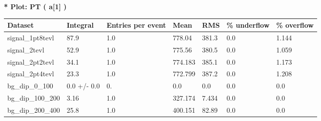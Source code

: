 \documentclass[a4paper, 10pt]{article}
\begin{document}
\textbf{* Plot: PT ( a[1] ) }\\
   \begin{table}[H]
  \begin{center}
    \begin{tabular}{|m{23.0mm}|m{23.0mm}|m{18.0mm}|m{19.0mm}|m{19.0mm}|m{19.0mm}|m{19.0mm}|}
      \hline
      {\cellcolor{yellow}         Dataset}& {\cellcolor{yellow}         Integral}& {\cellcolor{yellow}         Entries per event}& {\cellcolor{yellow}         Mean}& {\cellcolor{yellow}         RMS}& {\cellcolor{yellow}         \% underflow}& {\cellcolor{yellow}         \% overflow}\\
      \hline
      {\cellcolor{white}         signal\_1pt8tevl}& {\cellcolor{white}         87.9}& {\cellcolor{white}         1.0}& {\cellcolor{white}         778.04}& {\cellcolor{white}         381.3}& {\cellcolor{green}         0.0}& {\cellcolor{green}         1.144}\\
      \hline
      {\cellcolor{white}         signal\_2tevl}& {\cellcolor{white}         52.9}& {\cellcolor{white}         1.0}& {\cellcolor{white}         775.56}& {\cellcolor{white}         380.5}& {\cellcolor{green}         0.0}& {\cellcolor{green}         1.059}\\
      \hline
      {\cellcolor{white}         signal\_2pt2tevl}& {\cellcolor{white}         34.1}& {\cellcolor{white}         1.0}& {\cellcolor{white}         774.183}& {\cellcolor{white}         385.1}& {\cellcolor{green}         0.0}& {\cellcolor{green}         1.173}\\
      \hline
      {\cellcolor{white}         signal\_2pt4tevl}& {\cellcolor{white}         23.3}& {\cellcolor{white}         1.0}& {\cellcolor{white}         772.799}& {\cellcolor{white}         387.2}& {\cellcolor{green}         0.0}& {\cellcolor{green}         1.208}\\
      \hline
      {\cellcolor{white}         bg\_dip\_0\_100}& {\cellcolor{white}         0.0 +/\-- 0.0}& {\cellcolor{white}         0.}& {\cellcolor{white}         0.0}& {\cellcolor{white}         0.0}& {\cellcolor{green}         0.0}& {\cellcolor{green}         0.0}\\
      \hline
      {\cellcolor{white}         bg\_dip\_100\_200}& {\cellcolor{white}         3.16}& {\cellcolor{white}         1.0}& {\cellcolor{white}         327.174}& {\cellcolor{white}         7.434}& {\cellcolor{green}         0.0}& {\cellcolor{green}         0.0}\\
      \hline
      {\cellcolor{white}         bg\_dip\_200\_400}& {\cellcolor{white}         25.8}& {\cellcolor{white}         1.0}& {\cellcolor{white}         400.151}& {\cellcolor{white}         82.89}& {\cellcolor{green}         0.0}& {\cellcolor{green}         0.0}\\

\end{tabular}
\end{center}
\end{table}
\end{document}
